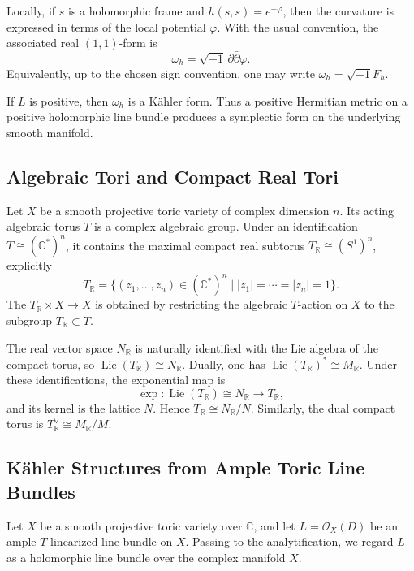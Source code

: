 {Locally, if \(s\) is a holomorphic frame and \(h(s,s)=e^{-\varphi}\),
then the curvature is expressed in terms of the local potential
\(\varphi\).  With the usual convention, the associated real
\((1,1)\)-form is
\[
\omega_h=\sqrt{-1}\,\partial\bar\partial\varphi.
\]
Equivalently, up to the chosen sign convention, one may write
\(\omega_h=\sqrt{-1}F_h\).

If \(L\) is positive, then \(\omega_h\) is a Kähler form.  Thus a
positive Hermitian metric on a positive holomorphic line bundle produces
a symplectic form on the underlying smooth manifold.







\subsection{Algebraic Tori and Compact Real Tori}

Let \(X\) be a smooth projective toric variety of complex dimension
\(n\).  Its acting algebraic torus \(T\) is a complex algebraic group.
Under an identification \(T\cong(\mathbb C^*)^n\), it contains the
maximal compact real subtorus
\(T_{\mathbb R}\cong(S^1)^n\), explicitly
\[
T_{\mathbb R}
=
\{(z_1,\dots,z_n)\in(\mathbb C^*)^n
\mid |z_1|=\cdots=|z_n|=1\}.
\]
The  \(T_{\mathbb R}\times X\to X\) is
obtained by restricting the algebraic \(T\)-action on \(X\) to the
subgroup \(T_{\mathbb R}\subset T\).

The real vector space \(N_{\mathbb R}\) is naturally identified with the
Lie algebra of the compact torus, so
\(\operatorname{Lie}(T_{\mathbb R})\cong N_{\mathbb R}\).  Dually, one
has \(\operatorname{Lie}(T_{\mathbb R})^*\cong M_{\mathbb R}\).  Under
these identifications, the exponential map is
\[
\exp:\operatorname{Lie}(T_{\mathbb R})\cong N_{\mathbb R}
\longrightarrow T_{\mathbb R},
\]
and its kernel is the lattice \(N\).  Hence
\(T_{\mathbb R}\cong N_{\mathbb R}/N\).  Similarly, the dual compact
torus is \(T_{\mathbb R}^{\vee}\cong M_{\mathbb R}/M\).






\subsection{Kähler Structures from Ample Toric Line Bundles}

Let \(X\) be a smooth projective toric variety over \(\mathbb C\), and let
\(L=\mathcal O_X(D)\) be an ample \(T\)-linearized line bundle on \(X\).
Passing to the analytification, we regard \(L\) as a holomorphic line
bundle over the complex manifold \(X\).

}
